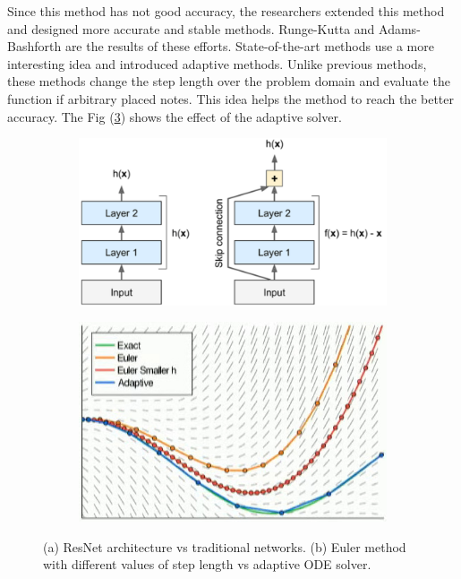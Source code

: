 \documentclass{article}
\newcommand\pef[1]{(\ref{#1})}
\begin{document}
	Since this method has not good accuracy, the researchers extended this method and designed more accurate and stable methods. Runge-Kutta and Adams-Bashforth are the results of these efforts. State-of-the-art methods use a more interesting idea and introduced adaptive methods. Unlike previous methods, these methods change the step length over the problem domain and evaluate the function if arbitrary placed notes. This idea helps the method to reach the better accuracy. The Fig \pef{fig:solvers} shows the effect of the adaptive solver.
	\begin{figure}
		\centering	
		\begin{subfigure}{.49\textwidth}
			\includegraphics[width=1\linewidth]{images/resnet}
			\caption{}
			\label{fig:resnet}
		\end{subfigure}
		\centering
		\begin{subfigure}{.49\textwidth}
			\includegraphics[width=1\linewidth]{images/ode}
			\caption{}
			\label{fig:solvers}
		\end{subfigure}
		\caption{(a) ResNet architecture vs traditional networks. (b) Euler method with different values of step length vs adaptive ODE solver.}
	\end{figure}
\end{document}
